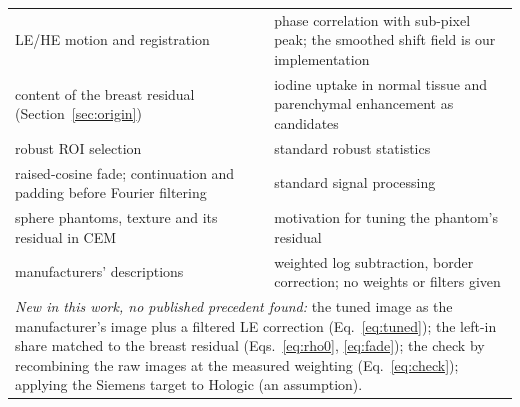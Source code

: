 \documentclass[11pt,a4paper]{article}
\begin{document}
\begin{table}[H]
\begin{tabular}{p{4.2cm}p{3.5cm}p{7.2cm}}
LE/HE motion and registration & \cite{allec2012,sistermanns2021,foroosh2002,zitova2003} & phase correlation with sub-pixel peak; the smoothed shift field is our implementation \\
content of the breast residual (Section~\ref{sec:origin}) & \cite{hill2013b,sogani2017} & iodine uptake in normal tissue and parenchymal enhancement as candidates \\
robust ROI selection & \cite{rousseeuw1993,iglewicz1993,leys2013} & standard robust statistics \\
raised-cosine fade; continuation and padding before Fourier filtering & \cite{harris1978,moisan2011,liu2008} & standard signal processing \\
sphere phantoms, texture and its residual in CEM & \cite{gang2010,cockmartin2013,cockmartin2017,cockmartin2023,contillo2016,ding2017,ikejimba2016} & motivation for tuning the phantom's residual \\
manufacturers' descriptions & \cite{korporaal2018,knogler2016,puong2007,alsheik2020,smith2014} & weighted log subtraction, border correction; no weights or filters given \\
\midrule
\multicolumn{3}{p{15.6cm}}{\emph{New in this work, no published precedent found:} the tuned image as the manufacturer's image plus a filtered LE
correction (Eq.~\ref{eq:tuned}); the left-in share matched to the breast residual (Eqs.~\ref{eq:rho0}, \ref{eq:fade}); the
check by recombining the raw images at the measured weighting (Eq.~\ref{eq:check}); applying the Siemens target to
Hologic (an assumption).} \\
\bottomrule
\end{tabular}
\end{table}
\end{document}
